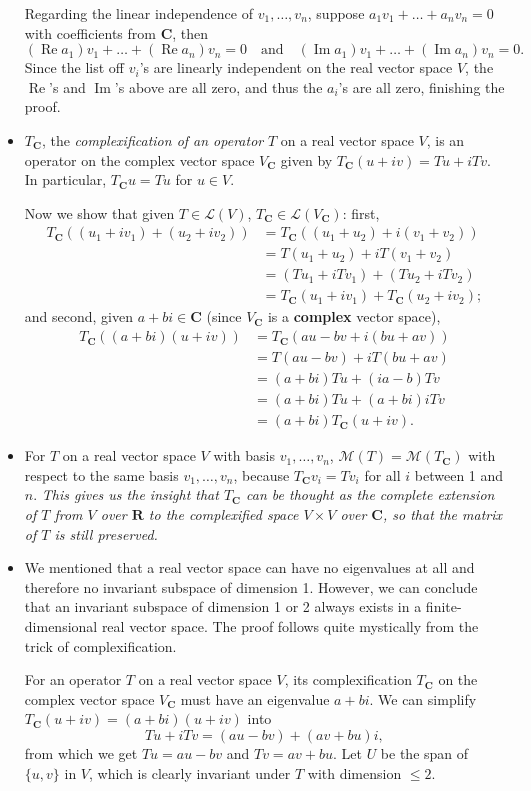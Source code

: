 \documentclass[11pt]{article}
\newcommand{\df}[1]{\textit{\textsf{#1}}}
\newcommand{\R}{\mathbf{R}}
\newcommand{\C}{\mathbf{C}}
\renewcommand{\Re}{\operatorname{Re}}
\renewcommand{\Im}{\operatorname{Im}}
\newcommand{\LV}{\mathcal{L}(V)}
\newcommand{\M}{\mathcal{M}}
\begin{document}
\begin{itemize}
    Regarding the linear independence of $v_1,\dots,v_n$, suppose $a_1v_1+\dots+a_nv_n = 0$ with coefficients from $\C$, then 
    \[(\Re a_1)v_1+ \dots + (\Re a_n)v_n = 0 \quad \text{and} \quad (\Im a_1)v_1 + \dots + (\Im a_n)v_n = 0.\]
    Since the list off $v_i$'s are linearly independent on the real vector space $V$, the $\Re$'s and $\Im$'s above are all zero, and thus the $a_i$'s are all zero, finishing the proof.
    \item $T_\C$, the \df{complexification of an operator} $T$ on a real vector space $V$, is an operator on the complex vector space $V_\C$ given by $T_\C (u+iv) = Tu + i Tv$. In particular, $T_\C u = Tu$ for $u \in V$.

    Now we show that given $T \in \LV$, $T_\C \in \mathcal{L}(V_\C)$: first, \begin{align*}
        T_\C((u_1+iv_1)+(u_2+iv_2)) & = T_\C((u_1+u_2)+i(v_1+v_2)) \\ & = T(u_1+u_2) + iT(v_1+v_2) \\ & = (Tu_1 + iTv_1) + (Tu_2 + iTv_2) \\ & = T_\C(u_1 + iv_1) + T_\C(u_2 + iv_2);
    \end{align*}
    and second, given $a+bi \in \C$ (since $V_\C$ is a \textbf{complex} vector space),
    \begin{align*}
        T_\C((a+bi)(u+iv)) & = T_\C(au-bv + i(bu+av)) \\ & = T(au-bv) + iT(bu+av) \\ & = (a+bi)Tu+(ia-b)Tv \\ & = (a+bi)Tu + (a+bi)iTv \\ & = (a+bi) T_\C(u+iv).
    \end{align*}
    \item For $T$ on a real vector space $V$ with basis $v_1,\dots,v_n$, $\M(T) = \M(T_\C)$ with respect to the same basis $v_1,\dots,v_n$, because $T_\C v_i = Tv_i$ for all $i$ between 1 and $n$. \emph{This gives us the insight that $T_\C$ can be thought as the complete extension of $T$ from $V$ over $\R$ to the complexified space $V \times V$ over $\C$, so that the matrix of $T$ is still preserved.}
    \item We mentioned that a real vector space can have no eigenvalues at all and therefore no invariant subspace of dimension 1. However, we can conclude that an invariant subspace of dimension 1 or 2 always exists in a finite-dimensional real vector space. The proof follows quite mystically from the trick of complexification.

    For an operator $T$ on a real vector space $V$, its complexification $T_\C$ on the complex vector space $V_\C$ must have an eigenvalue $a+bi$. We can simplify $T_\C(u+iv) = (a+bi)(u+iv)$ into \[Tu+iTv = (au-bv)+(av+bu)i,\] from which we get $Tu = au-bv$ and $Tv = av+bu$. Let $U$ be the span of $\{u,v\}$ in $V$, which is clearly invariant under $T$ with dimension $\leq 2$.
    

\end{itemize}
\end{document}
